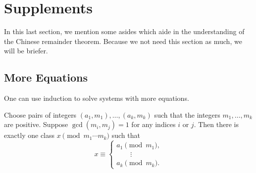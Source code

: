 \documentclass{article}
\begin{document}
\section{Supplements} \label{sec:supp}
In this last section, we mention some asides which aide in the understanding of the Chinese remainder theorem. Because we not need this section as much, we will be briefer.

\subsection{More Equations}
One can use induction to solve systems with more equations.
\begin{theorem} \label{thm:crt-more-eqs}
	Choose pairs of integers $(a_1,m_1),\ldots,(a_k,m_k)$ such that the integers $m_1,\ldots,m_k$ are positive. Suppose $\gcd(m_i,m_j)=1$ for any indices $i$ or $j$. Then there is exactly one class $x\pmod{m_1\cdots m_k}$ such that
	\[x\equiv\begin{cases}
		a_1 \pmod{m_1}, \\
		\qquad\vdots \\
		a_k \pmod{m_k}.
	\end{cases}\]
\end{theorem}
\end{document}
